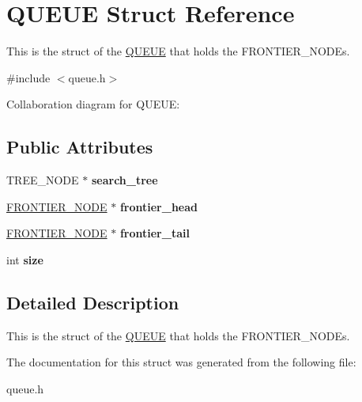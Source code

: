\hypertarget{structQUEUE}{}\section{Q\+U\+E\+UE Struct Reference}
\label{structQUEUE}


This is the struct of the \hyperlink{structQUEUE}{Q\+U\+E\+UE} that holds the F\+R\+O\+N\+T\+I\+E\+R\+\_\+\+N\+O\+D\+Es.  




{\ttfamily \#include $<$queue.\+h$>$}



Collaboration diagram for Q\+U\+E\+UE\+:
\subsection*{Public Attributes}
\begin{DoxyCompactItemize}
\item 
\mbox{\label{structQUEUE_ab03f3b61394102f38db609f30103b5ca}} 
T\+R\+E\+E\+\_\+\+N\+O\+DE $\ast$ {\bfseries search\+\_\+tree}
\item 
\mbox{\label{structQUEUE_a01f5abaf70543a81190ff78664647188}} 
\hyperlink{structfrontier__node}{F\+R\+O\+N\+T\+I\+E\+R\+\_\+\+N\+O\+DE} $\ast$ {\bfseries frontier\+\_\+head}
\item 
\mbox{\label{structQUEUE_a1ba83f2481bf00ad19be069618da09b8}} 
\hyperlink{structfrontier__node}{F\+R\+O\+N\+T\+I\+E\+R\+\_\+\+N\+O\+DE} $\ast$ {\bfseries frontier\+\_\+tail}
\item 
\mbox{\label{structQUEUE_a31b512e395a844d5a90ce52ff9606464}} 
int {\bfseries size}
\end{DoxyCompactItemize}


\subsection{Detailed Description}
This is the struct of the \hyperlink{structQUEUE}{Q\+U\+E\+UE} that holds the F\+R\+O\+N\+T\+I\+E\+R\+\_\+\+N\+O\+D\+Es. 

The documentation for this struct was generated from the following file\+:\begin{DoxyCompactItemize}
\item 
queue.\+h\end{DoxyCompactItemize}
